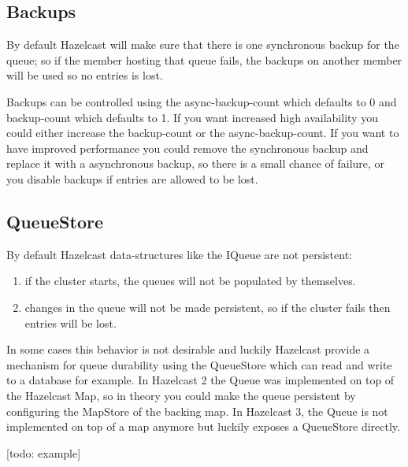 \subsection{Backups}
By default Hazelcast will make sure that there is one synchronous backup for the queue; so if the member hosting that queue fails, the backups on another member will be used so no entries is lost.

Backups can be controlled using the async-backup-count which defaults to 0 and backup-count which defaults to 1. If you want increased high availability you could either increase the backup-count or the async-backup-count. If you want to have improved performance you could remove the synchronous backup and replace it with a asynchronous backup, so there is a small chance of failure, or you disable backups if entries are allowed to be lost. 

\subsection{QueueStore}
By default Hazelcast data-structures like the IQueue are not persistent:
\begin{enumerate}
 \item if the cluster starts, the queues will not be populated by themselves.
 \item changes in the queue will not be made persistent, so if the cluster fails then entries will be lost.
\end{enumerate}
In some cases this behavior is not desirable and luckily Hazelcast provide a mechanism for queue durability using the QueueStore which can read and write to a database for example. In Hazelcast 2 the Queue was implemented on top of the Hazelcast Map, so in theory you could make the queue persistent by configuring the MapStore of the backing map. In Hazelcast 3, the Queue is not implemented on top of a map anymore but luckily exposes a QueueStore directly.

[todo: example]

